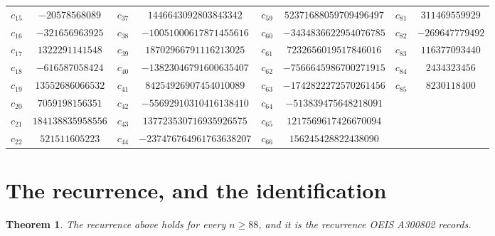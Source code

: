 \documentclass[11pt,a4paper]{article}
\theoremstyle{plain}
\newtheorem{theorem}{Theorem}
\theoremstyle{definition}
\begin{document}
\begin{center}
\begin{tabular}{cccccccc}
$c_{15}$ & $-20578568089$ & $c_{37}$ & $1446643092803843342$ & $c_{59}$ & $52371688059709496497$ & $c_{81}$ & $311469559929$ \\
$c_{16}$ & $-321656963925$ & $c_{38}$ & $-10051000617871455616$ & $c_{60}$ & $-3434836622954076785$ & $c_{82}$ & $-269647779492$ \\
$c_{17}$ & $1322291141548$ & $c_{39}$ & $18702966791116213025$ & $c_{61}$ & $7232656019517846016$ & $c_{83}$ & $116377093440$ \\
$c_{18}$ & $-616587058424$ & $c_{40}$ & $-13823046791600635407$ & $c_{62}$ & $-7566645986700271915$ & $c_{84}$ & $2434323456$ \\
$c_{19}$ & $13552686066532$ & $c_{41}$ & $84254926907454010089$ & $c_{63}$ & $-1742822272570261456$ & $c_{85}$ & $8230118400$ \\
$c_{20}$ & $7059198156351$ & $c_{42}$ & $-55692910310416138410$ & $c_{64}$ & $-513839475648218091$ &  &  \\
$c_{21}$ & $184138835958556$ & $c_{43}$ & $137723530716935926575$ & $c_{65}$ & $1217569617426670094$ &  &  \\
$c_{22}$ & $521511605223$ & $c_{44}$ & $-237476764961763638207$ & $c_{66}$ & $156245428822438090$ &  &  \\
\end{tabular}
\end{center}

\section{The recurrence, and the identification}

\begin{theorem}
The recurrence above holds for every $n\ge88$, and it is the recurrence OEIS A300802 records.
\end{theorem}
\end{document}
